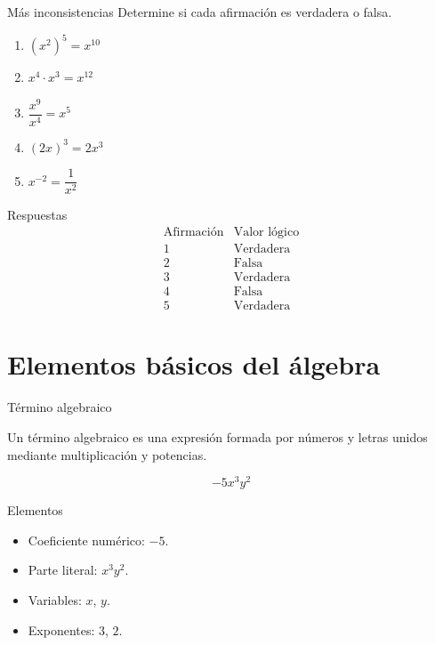 \documentclass[handout,aspectratio=169]{beamer}
\begin{document}
	\begin{frame}{Más inconsistencias}
		Determine si cada afirmación es verdadera o falsa.
		
		\begin{enumerate}
			\item \((x^2)^5=x^{10}\)
			\item \(x^4\cdot x^3=x^{12}\)
			\item \(\dfrac{x^9}{x^4}=x^5\)
			\item \((2x)^3=2x^3\)
			\item \(x^{-2}=\dfrac{1}{x^2}\)
		\end{enumerate}
		
		\pause
		
		\begin{block}{Respuestas}
			\[
			\begin{array}{c|c}
				\text{Afirmación} & \text{Valor lógico} \\
				\hline
				1 & \text{Verdadera} \\
				2 & \text{Falsa} \\
				3 & \text{Verdadera} \\
				4 & \text{Falsa} \\
				5 & \text{Verdadera}
			\end{array}
			\]
		\end{block}
	\end{frame}
	
	\section{Elementos básicos del álgebra}
	
	\begin{frame}{Término algebraico}
		\begin{idea}
			Un término algebraico es una expresión formada por números y letras unidos mediante multiplicación y potencias.
		\end{idea}
		
		\pause
		
		\[
		-5x^3y^2
		\]
		
		\pause
		
		\begin{block}{Elementos}
			\begin{itemize}
				\item Coeficiente numérico: \(-5\).
				\item Parte literal: \(x^3y^2\).
				\item Variables: \(x\), \(y\).
				\item Exponentes: \(3\), \(2\).
			\end{itemize}
		\end{block}
	\end{frame}
	
\end{document}
